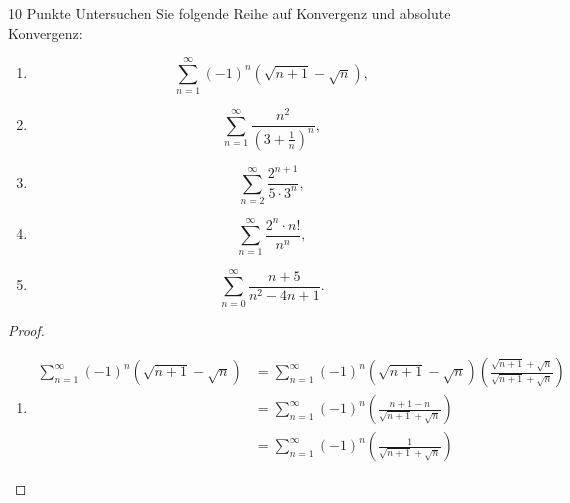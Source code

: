 \documentclass{problemset}
\author{Michael van Straten}
\begin{document}
\maketitle


\begin{problem}{10 Punkte}
Untersuchen Sie folgende Reihe auf Konvergenz und absolute Konvergenz:
\begin{enumerate}
    \item \[
              \sum_{n=1}^{\infty} (-1)^n(\sqrt{n + 1} - \sqrt{n}),
          \]
    \item \[
              \sum_{n=1}^{\infty} \frac{n^2}{{(3 + \frac{1}{n})}^n},
          \]
    \item \[
              \sum_{n=2}^{\infty} \frac{2^{n+1}}{5 \cdot 3^n},
          \]
    \item \[
              \sum_{n=1}^{\infty} \frac{2^n \cdot n!}{n^n},
          \]
    \item \[
              \sum_{n=0}^{\infty} \frac{n + 5}{n^2 - 4n + 1}.
          \]
\end{enumerate}
\begin{proof}
    $ $

    \begin{enumerate}
        \item
              \begin{align*}
                  \sum_{n=1}^{\infty} (-1)^n(\sqrt{n + 1} - \sqrt{n}) & = \sum_{n=1}^{\infty} (-1)^n(\sqrt{n + 1} - \sqrt{n}) \left(\frac{\sqrt{n + 1} + \sqrt{n}}{\sqrt{n + 1} + \sqrt{n}}\right) \\
                                                                      & = \sum_{n=1}^{\infty} (-1)^n \left(\frac{n + 1 - n}{\sqrt{n + 1} + \sqrt{n}}\right) \tag {$(a - b)(a+b) = a^2-b^2$}        \\
                                                                      & = \sum_{n=1}^{\infty} (-1)^n \left(\frac{1}{\sqrt{n + 1} + \sqrt{n}}\right)
              \end{align*}


\end{enumerate}
\end{proof}
\end{problem}
\end{document}
